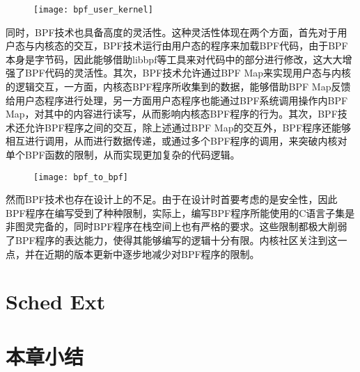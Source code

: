 \begin{figure}[!htbp]
    \centering
    \texttt{[image: bpf\_user\_kernel]}
    \label{fig:bpf_user_kernel}
\end{figure}

同时，BPF技术也具备高度的灵活性。这种灵活性体现在两个方面，首先对于用户态与内核态的交互，BPF技术运行由用户态的程序来加载BPF代码，由于BPF本身是字节码，因此能够借助libbpf等工具来对代码中的部分进行修改，这大大增强了BPF代码的灵活性。其次，BPF技术允许通过BPF Map来实现用户态与内核的逻辑交互，一方面，内核态BPF程序所收集到的数据，能够借助BPF Map反馈给用户态程序进行处理，另一方面用户态程序也能通过BPF系统调用操作内BPF Map，对其中的内容进行读写，从而影响内核态BPF程序的行为。其次，BPF技术还允许BPF程序之间的交互，除上述通过BPF Map的交互外，BPF程序还能够相互进行调用，从而进行数据传递，或通过多个BPF程序的调用，来突破内核对单个BPF函数的限制，从而实现更加复杂的代码逻辑。

\begin{figure}[!htbp]
    \centering
    \texttt{[image: bpf\_to\_bpf]}
    \label{fig:bpf_to_bpf}
\end{figure}

然而BPF技术也存在设计上的不足。由于在设计时首要考虑的是安全性，因此BPF程序在编写受到了种种限制，实际上，编写BPF程序所能使用的C语言子集是非图灵完备的，同时BPF程序在栈空间上也有严格的要求。这些限制都极大削弱了BPF程序的表达能力，使得其能够编写的逻辑十分有限。内核社区关注到这一点，并在近期的版本更新中逐步地减少对BPF程序的限制。

\section{Sched Ext}



\section{本章小结}